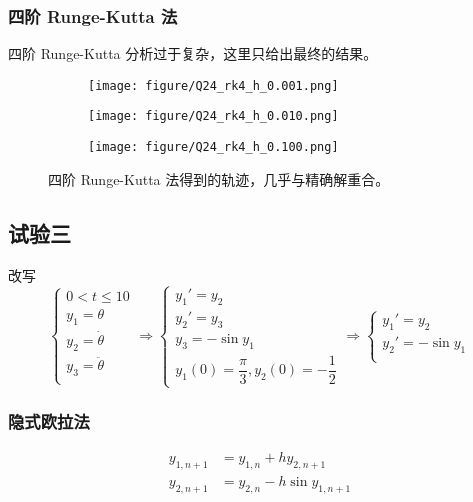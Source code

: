 \documentclass{article}
\begin{document}
\subsubsection{四阶 Runge-Kutta 法}
四阶 Runge-Kutta 分析过于复杂，这里只给出最终的结果。
\begin{figure*}[h]
    \begin{subfigure}[h]{0.3\textwidth}
        \centering
        \texttt{[image: figure/Q24\_rk4\_h\_0.001.png]}
    \end{subfigure}
    \begin{subfigure}[h]{0.3\textwidth}
        \centering
        \texttt{[image: figure/Q24\_rk4\_h\_0.010.png]}
    \end{subfigure}
    \begin{subfigure}[h]{0.3\textwidth}
        \centering
        \texttt{[image: figure/Q24\_rk4\_h\_0.100.png]}
    \end{subfigure}
    \caption{四阶 Runge-Kutta 法得到的轨迹，几乎与精确解重合。}
    \label{fig:Runge-Kutta}
\end{figure*}
    
\subsection{试验三}
改写
\begin{equation*}
    \begin{cases}
        0<t\le10\\
        y_1 = \theta\\
        y_2 = \dot{\theta}\\
        y_3 = \ddot{\theta}\\
    \end{cases}\Rightarrow
    \begin{cases}
        y_1'=y_2\\
        y_2'=y_3\\
        y_3=-\sin y_1\\
        y_1(0)=\dfrac{\pi}{3},y_2(0)=-\dfrac{1}{2}
    \end{cases}\Rightarrow
    \begin{cases}
        y_1'=y_2\\
        y_2'=-\sin y_1\\
    \end{cases}
\end{equation*}

\subsubsection{隐式欧拉法}
\begin{equation*}
    \begin{aligned}
        y_{1,n+1}&=y_{1,n}+hy_{2,n+1}\\
        y_{2,n+1}&=y_{2,n}-h\sin y_{1,n+1}\\
    \end{aligned}
\end{equation*}
\end{document}
